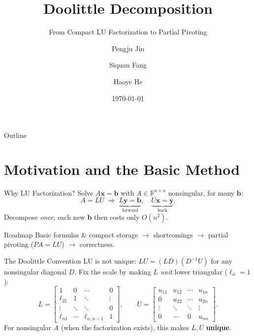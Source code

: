 \documentclass[11pt,aspectratio=169]{beamer}
\title[Doolittle Decomposition]{Doolittle Decomposition}
\subtitle{From Compact LU Factorization to Partial Pivoting}
\author[Pengju Jin, Siquan Fang, Haoye He]{Pengju Jin \and Siquan Fang \and Haoye He}
\institute[Zhejiang University]{Zhejiang University}
\date{\today}
\newcommand{\R}{\mathbb{R}}
\newcommand{\mat}[1]{\begin{bmatrix}#1\end{bmatrix}}
\begin{document}
\begin{frame}
  \titlepage
\end{frame}

\begin{frame}{Outline}
  \tableofcontents
\end{frame}

\section{Motivation and the Basic Method}

\begin{frame}{Why LU Factorization?}
  Solve $A\mathbf{x}=\mathbf{b}$ with $A\in\R^{n\times n}$ nonsingular, for many $\mathbf{b}$:
  \[
    A=LU \;\Longrightarrow\;
    \underbrace{L\mathbf{y}=\mathbf{b}}_{\text{forward}},\quad
    \underbrace{U\mathbf{x}=\mathbf{y}}_{\text{back}}.
  \]
  Decompose \emph{once}; each new $\mathbf{b}$ then costs only $O(n^2)$.
  \vfill
  \begin{alertblock}{Roadmap}
    Basic formulas \& compact storage $\to$ shortcomings $\to$
    partial pivoting ($PA=LU$) $\to$ correctness.
  \end{alertblock}
\end{frame}

\begin{frame}{The Doolittle Convention}
  LU is not unique: $LU=(LD)(D^{-1}U)$ for any nonsingular diagonal $D$.
  Fix the scale by making $L$ \emph{unit} lower triangular ($\ell_{ii}=1$):
  \[
    L=\mat{1&0&\cdots&0\\ \ell_{21}&1&\ddots&\vdots\\ \vdots&\ddots&\ddots&0\\ \ell_{n1}&\cdots&\ell_{n,n-1}&1},
    \qquad
    U=\mat{u_{11}&u_{12}&\cdots&u_{1n}\\0&u_{22}&\cdots&u_{2n}\\\vdots&\ddots&\ddots&\vdots\\0&\cdots&0&u_{nn}}.
  \]
  For nonsingular $A$ (when the factorization exists), this makes $L,U$ \textbf{unique}.
\end{frame}
\end{document}
